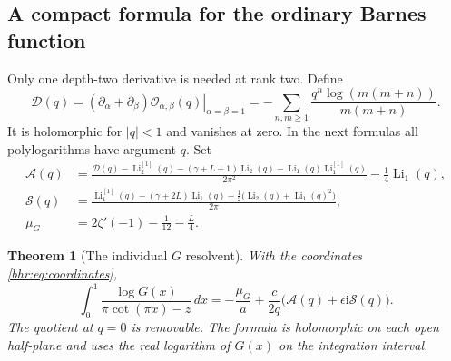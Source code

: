 \documentclass[11pt]{article}
\numberwithin{equation}{section}
\theoremstyle{plain}
\newtheorem{theorem}{Theorem}[section]
\theoremstyle{definition}
\theoremstyle{remark}
\DeclareMathOperator{\Li}{Li}
\newcommand{\ii}{\mathrm i}
\begin{document}
\subsection{A compact formula for the ordinary Barnes function}

Only one depth-two derivative is needed at rank two. Define
\begin{equation}\label{bhr:eq:Dq}
 \mathcal D(q)=
    \left.(\partial_\alpha+\partial_\beta)
                      \mathcal O_{\alpha,\beta}(q)\right|_{\alpha=\beta=1}
  =-\sum_{n,m\ge1}\frac{q^n\log(m(m+n))}{m(m+n)}.
\end{equation}
It is holomorphic for $|q|<1$ and vanishes at zero. In the next
formulas all polylogarithms have argument $q$. Set
\begin{align}
 \mathcal A(q)
  &=\frac{\mathcal D(q)-\Li_2^{[1]}(q)
       -(\gamma+L+1)\Li_2(q)-\Li_1(q)\Li_1^{[1]}(q)}{2\pi^2}
           -\frac14\Li_1(q),\label{bhr:eq:Aq}\\
 \mathcal S(q)
  &=\frac{\Li_1^{[1]}(q)-(\gamma+2L)\Li_1(q)
            -\tfrac12\bigl(\Li_2(q)+\Li_1(q)^2\bigr)}{2\pi},
        \label{bhr:eq:Sq}\\
 \mu_G&=2\zeta'(-1)-\frac1{12}-\frac L4.
       \label{bhr:eq:meanG}
\end{align}

\begin{theorem}[The individual $G$ resolvent]\label{bhr:thm:G-resolvent}
With the coordinates \eqref{bhr:eq:coordinates},
\begin{equation}\label{bhr:eq:G-resolvent}
 \boxed{\displaystyle
 \int_0^1\frac{\log G(x)}{\pi\cot(\pi x)-z}\,dx
    =-\frac{\mu_G}{a}
       +\frac c{2q}\bigl(\mathcal A(q)+\epsilon\ii\mathcal S(q)\bigr).}
\end{equation}
The quotient at $q=0$ is removable. The formula is holomorphic
on each open half-plane and uses the real logarithm of $G(x)$
on the integration interval.
\end{theorem}
\end{document}
